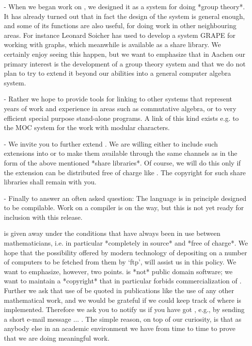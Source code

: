   \item{-}
    When we began  work on {\GAP}, we designed  it as a system for  doing
    *group theory*.  It has already turned out that in fact the design of
    the system is general  enough,  and some  of  its functions are  also
    useful,  for  doing work in  other  neighbouring areas.  For instance
    Leonard  Soicher has used {\GAP} to  develop a system {\sf GRAPE} for
    working with graphs, which meanwhile is available as a share library.
    We certainly enjoy seeing this happen, but we  want to emphasize that
    in Aachen our  primary interest is the development  of a group theory
    system and that    we do not plan  to   try to extend it  beyond  our
    abilities into a general computer algebra system.

  \item{-}
    Rather  we hope to provide tools  for linking {\GAP} to other systems
    that  represent years  of  work  and  experience   in areas  such  as
    commutative algebra, or to very efficient special purpose stand-alone
    programs.  A link of this kind exists e.g.  to the MOC system for the
    work with modular characters.

  \item{-}
    We invite you  to further extend   {\GAP}.  We are willing either  to
    include such extensions into {\GAP} or to make them available through
    the same channels as {\GAP} in the form of the above mentioned *share
    libraries*.  Of course, we will do this  only if the extension can be
    distributed free of charge like {\GAP}.  The copyright for such share
    libraries shall remain with you.

  \item{-}
    Finally to answer an often asked question: The  {\GAP} language is in
    principle  designed to be compilable.  Work  on a compiler  is on the
    way, but this is not yet ready for inclusion with this release.
\endlist

{\GAP} is given  away under the  conditions that have always  been in use
between  mathematicians, i.e.  in particular *completely  in source*  and
*free  of  charge*.  We  hope  that  the  possibility  offered  by modern
technology of  depositing {\GAP} on a number of  computers  to be fetched
from them by `ftp', will assist us in this policy.  We want to emphasize,
however, two points.  {\GAP} is  *not* public domain software; we want to
maintain  a *copyright* that  in particular forbids  commercialization of
{\GAP}.  Further we ask that use of {\GAP} be quoted in publications like
the use of any  other mathematical work, and  we would be grateful if  we
could keep track of where {\GAP} is implemented.  Therefore we ask you to
notify us if you have got {\GAP}, e.g., by sending a short e-mail message
$\ldots$ .
The simple reason,  on top of our
curiosity, is that  as anybody  else in  an academic  environment we have
from time to time to prove that we are doing meaningful work.

